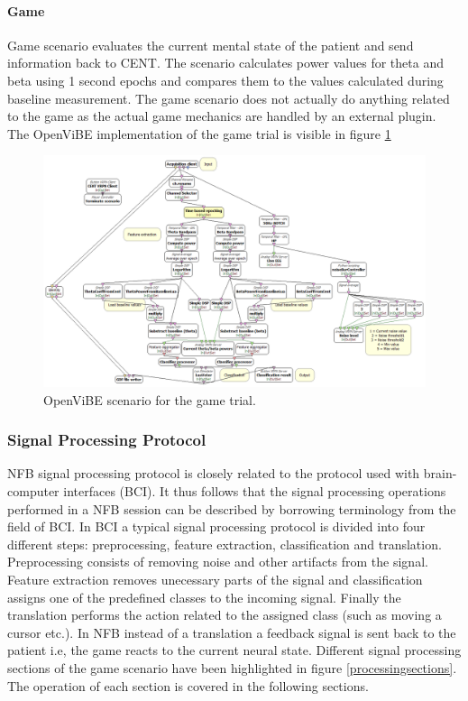 \paragraph{Game}
Game scenario evaluates the current mental state of the patient and send information back to CENT. The scenario calculates power values for theta and beta using 1 second epochs and compares them to the values calculated during baseline measurement. The game scenario does not actually do anything related to the game as the actual game mechanics are handled by an external plugin. The OpenViBE implementation of the game trial is visible in figure \ref{gametrial}

\begin{figure}[h]
	\centering
	\includegraphics[scale=0.3]{game.png}
	\caption{OpenViBE scenario for the game trial.}\label{gametrial}
\end{figure}
  
\subsubsection{Signal Processing Protocol}
NFB signal processing protocol is closely related to the protocol used with brain-computer interfaces (BCI). It thus follows that the signal processing operations performed in a NFB session can be described by borrowing terminology from the field of BCI. In BCI a typical signal processing protocol is divided into four different steps: preprocessing, feature extraction, classification and translation. Preprocessing consists of removing noise and other artifacts from the signal. Feature extraction removes unecessary parts of the signal and classification assigns one of the predefined classes to the incoming signal. Finally the translation performs the action related to the assigned class (such as moving a cursor etc.). In NFB instead of a translation a feedback signal is sent back to the patient i.e, the game reacts to the current neural state. Different signal processing sections of the game scenario have been highlighted in figure \ref{processingsections}. The operation of each section is covered in the following sections.

